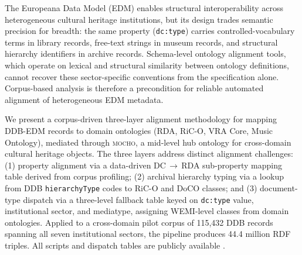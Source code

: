 
The Europeana Data Model (EDM) enables structural interoperability across
heterogeneous cultural heritage institutions, but its design trades semantic
precision for breadth: the same property (\texttt{dc:type}) carries
controlled-vocabulary terms in library records, free-text strings in museum
records, and structural hierarchy identifiers in archive records.
Schema-level ontology alignment tools, which operate on lexical and structural
similarity between ontology definitions, cannot recover these sector-specific
conventions from the specification alone.
Corpus-based analysis is therefore a precondition for reliable automated
alignment of heterogeneous EDM metadata.

We present a corpus-driven three-layer alignment methodology for mapping
DDB-EDM records to domain ontologies (RDA, RiC-O, VRA Core, Music Ontology),
mediated through \textsc{mocho}, a mid-level hub ontology for cross-domain
cultural heritage objects.
The three layers address distinct alignment challenges: (1) property alignment
via a data-driven DC\,$\to$\,RDA sub-property mapping table derived from
corpus profiling; (2) archival hierarchy typing via a lookup from DDB
\texttt{hierarchyType} codes to RiC-O and DoCO classes; and (3) document-type
dispatch via a three-level fallback table keyed on \texttt{dc:type} value,
institutional sector, and mediatype, assigning WEMI-level classes from domain
ontologies.
Applied to a cross-domain pilot corpus of 115{,}432 DDB records spanning all
seven institutional sectors, the pipeline produces 44.4 million RDF triples.
All scripts and dispatch tables are publicly available .

